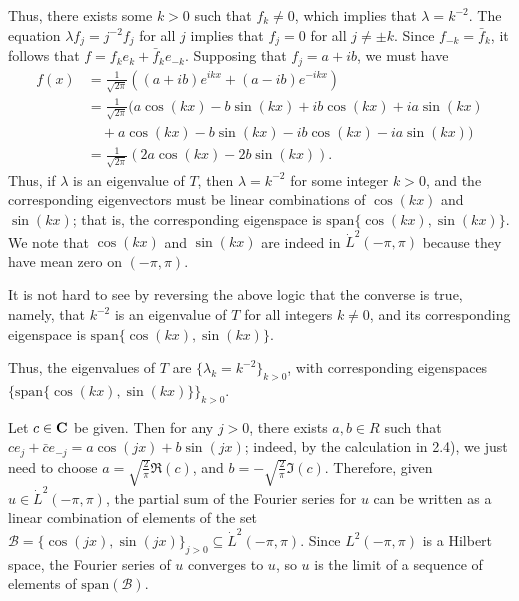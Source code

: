 \documentclass{homework}
\begin{document}
\begin{arabicparts}
		Thus, there exists some $k > 0$ such that $f_{k} \ne0$, which implies that $\lambda = k^{-2}$. The equation $\lambda f_j = j^{-2}f_j$ for all $j$ implies that $f_j = 0$ for all $j \ne \pm k$. Since $f_{-k} = \bar{f}_{k}$, it follows that $f = f_{k}e_{k} + \bar{f}_ke_{-k}$. Supposing that $f_j = a + ib$, we must have
		\begin{align}
			f(x) &= \frac{1}{\sqrt{2\pi}}\left((a+ib)e^{ikx} + (a-ib)e^{-ikx}\right) \\
			&= \frac{1}{\sqrt{2\pi}}\big(a\cos(kx) - b\sin(kx) +ib\cos(kx) + ia\sin(kx)\\
			&\quad{}+ a\cos(kx) -b\sin(kx) - ib\cos(kx) -ia\sin(kx)\big) \\
			&= \frac{1}{\sqrt{2\pi}}\left(2a\cos(kx) - 2b\sin(kx)\right).
		\end{align}
		Thus, if $\lambda$ is an eigenvalue of $T$, then $\lambda = k^{-2}$ for some integer $k >0$, and the corresponding eigenvectors must be linear combinations of $\cos(kx)$ and $\sin(kx)$; that is, the corresponding eigenspace is $\mathrm{span}\{\cos(kx), \sin(kx)\}$. We note that $\cos(kx)$ and $\sin(kx)$ are indeed in $\dot{L}^2(-\pi,\pi)$ because they have mean zero on $(-\pi, \pi)$.
		
		It is not hard to see by reversing the above logic that the converse is true, namely, that $k^{-2}$ is an eigenvalue of $T$ for all integers $k \ne0$, and its corresponding eigenspace is $\mathrm{span}\{\cos(kx),\sin(kx)\}$. 
		
		Thus, the eigenvalues of $T$ are $\{\lambda_k = k^{-2}\}_{k>0}$, with corresponding eigenspaces $\{\mathrm{span}\{\cos(kx),\sin(kx)\}\}_{k>0}$.
		
		\questionpart
		Let $c \in \textnormal{\bf C}$ be given. Then for any $j > 0$, there exists $a,b \in R$ such that $ce_j + \bar{c}e_{-j} = a\cos(jx) + b\sin(jx)$; indeed, by the calculation in 2.4), we just need to choose $a = \sqrt{\frac{2}{\pi}}\Re(c)$, and $b = -\sqrt{\frac{2}{\pi}}\Im(c)$. Therefore, given $u \in \dot{L}^2(-\pi,\pi)$, the partial sum of the Fourier series for $u$ can be written as a linear combination of elements of the set $\mathcal{B} = \{\cos(jx),\sin(jx)\}_{j>0} \subseteq \dot{L}^2(-\pi,\pi)$. Since $L^2(-\pi,\pi)$ is a Hilbert space, the Fourier series of $u$ converges to $u$, so $u$ is the limit of a sequence of elements of $\mathrm{span}(\mathcal{B})$.
		

\end{arabicparts}
\end{document}
